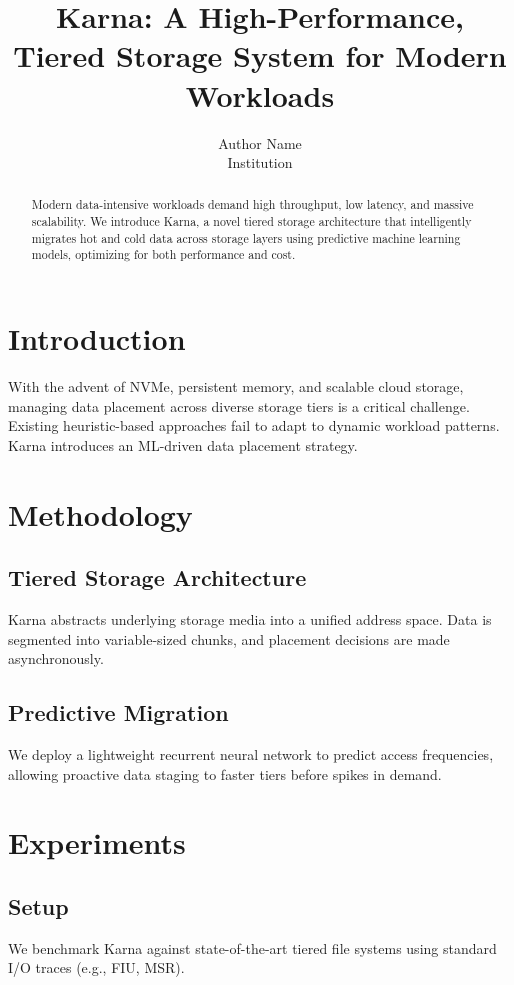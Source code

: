 \documentclass[letterpaper,twocolumn,10pt]{article}
\begin{document}
\title{\Large \bf Karna: A High-Performance, Tiered Storage System for Modern Workloads}

\author{
{\rm Author Name}\\
Institution
} %

\maketitle

\begin{abstract}
Modern data-intensive workloads demand high throughput, low latency, and massive scalability. We introduce Karna, a novel tiered storage architecture that intelligently migrates hot and cold data across storage layers using predictive machine learning models, optimizing for both performance and cost.
\end{abstract}

\section{Introduction}
With the advent of NVMe, persistent memory, and scalable cloud storage, managing data placement across diverse storage tiers is a critical challenge. Existing heuristic-based approaches fail to adapt to dynamic workload patterns. Karna introduces an ML-driven data placement strategy.

\section{Methodology}
\subsection{Tiered Storage Architecture}
Karna abstracts underlying storage media into a unified address space. Data is segmented into variable-sized chunks, and placement decisions are made asynchronously.
\subsection{Predictive Migration}
We deploy a lightweight recurrent neural network to predict access frequencies, allowing proactive data staging to faster tiers before spikes in demand.

\section{Experiments}
\subsection{Setup}
We benchmark Karna against state-of-the-art tiered file systems using standard I/O traces (e.g., FIU, MSR).
\end{document}
